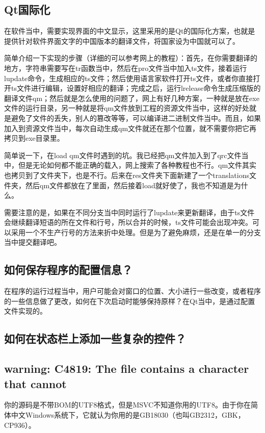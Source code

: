 \subsection{Qt国际化}
在软件当中，需要实现界面的中文显示，这里采用的是Qt的国际化方案，也就是提供针对软件界面文字的中国版本的翻译文件，将国家设为中国就可以了。

简单介绍一下实现的步骤（详细的可以参考网上的教程）：首先，在你需要翻译的地方，字符串需要写在tr函数当中，然后在pro文件当中加入ts文件，接着运行lupdate命令，生成相应的ts文件；然后使用语言家软件打开ts文件，或者你直接打开ts文件进行编辑，设置好相应的翻译；完成之后，运行lrelease命令生成压缩版的翻译文件qm；然后就是怎么使用的问题了，网上有好几种方案，一种就是放在exe文件的运行目录，另一种就是将qm文件放到工程的资源文件当中，这样的好处就是避免了文件的丢失，别人的篡改等等，可以编译进二进制文件当中。而且，如果加入到资源文件当中，每次自动生成qm文件就还在那个位置，就不需要你把它再拷贝到exe目录里。

简单说一下，在load qm文件时遇到的坑。我已经把qm文件加入到了qrc文件当中，但是无论如何都不能正确的载入，网上搜索了各种教程也不行。qm文件其实也拷贝到了文件夹下，也是不行。后来在res文件夹下面新建了一个translations文件夹，然后qm文件都放在了里面，然后接着load就好使了，我也不知道是为什么。

需要注意的是，如果在不同分支当中同时运行了lupdate来更新翻译，由于ts文件会继续翻译短语的所在文件和行号，所以合并的时候，ts文件可能会出现冲突。可以采用一个不生产行号的方法来折中处理。但是为了避免麻烦，还是在单一的分支当中提交翻译吧。

\subsection{如何保存程序的配置信息？}
在程序的运行过程当中，用户可能会对窗口的位置、大小进行一些改变，或者程序的一些信息做了更改，如何在下次启动时能够保持原样？在Qt当中，是通过配置文件实现的。

\subsection{如何在状态栏上添加一些复杂的控件？}

\subsection{warning: C4819: The file contains a character that cannot}
你的源码是不带BOM的UTF8格式，但是MSVC不知道你用的UTF8。由于你在简体中文Windows系统下，它就认为你用的是GB18030（也叫GB2312，GBK，CP936）。

